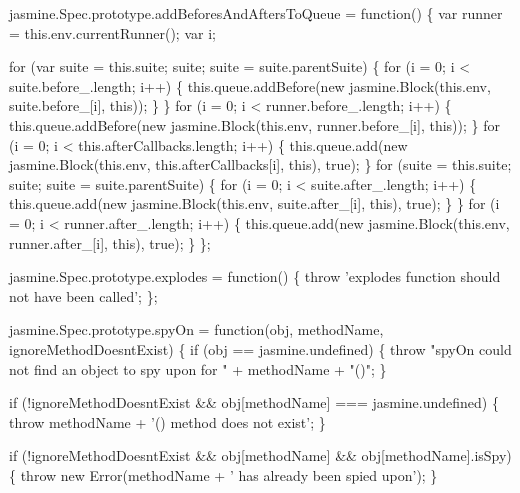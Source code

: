 \begin{DoxyCodeInclude}
jasmine.Spec.prototype.addBeforesAndAftersToQueue = \textcolor{keyword}{function}() \{
  var runner = this.env.currentRunner();
  var i;

  \textcolor{keywordflow}{for} (var suite = this.suite; suite; suite = suite.parentSuite) \{
    \textcolor{keywordflow}{for} (i = 0; i < suite.before\_.length; i++) \{
      this.queue.addBefore(\textcolor{keyword}{new} jasmine.Block(\textcolor{keyword}{this}.env, suite.before\_[i], \textcolor{keyword}{this}));
    \}
  \}
  \textcolor{keywordflow}{for} (i = 0; i < runner.before\_.length; i++) \{
    this.queue.addBefore(\textcolor{keyword}{new} jasmine.Block(\textcolor{keyword}{this}.env, runner.before\_[i], \textcolor{keyword}{this}));
  \}
  \textcolor{keywordflow}{for} (i = 0; i < this.afterCallbacks.length; i++) \{
    this.queue.add(\textcolor{keyword}{new} jasmine.Block(\textcolor{keyword}{this}.env, \textcolor{keyword}{this}.afterCallbacks[i], \textcolor{keyword}{this}), \textcolor{keyword}{true});
  \}
  \textcolor{keywordflow}{for} (suite = this.suite; suite; suite = suite.parentSuite) \{
    \textcolor{keywordflow}{for} (i = 0; i < suite.after\_.length; i++) \{
      this.queue.add(\textcolor{keyword}{new} jasmine.Block(\textcolor{keyword}{this}.env, suite.after\_[i], \textcolor{keyword}{this}), \textcolor{keyword}{true});
    \}
  \}
  \textcolor{keywordflow}{for} (i = 0; i < runner.after\_.length; i++) \{
    this.queue.add(\textcolor{keyword}{new} jasmine.Block(\textcolor{keyword}{this}.env, runner.after\_[i], \textcolor{keyword}{this}), \textcolor{keyword}{true});
  \}
\};

jasmine.Spec.prototype.explodes = \textcolor{keyword}{function}() \{
  \textcolor{keywordflow}{throw} \textcolor{stringliteral}{'explodes function should not have been called'};
\};

jasmine.Spec.prototype.spyOn = \textcolor{keyword}{function}(obj, methodName, ignoreMethodDoesntExist) \{
  \textcolor{keywordflow}{if} (obj == jasmine.undefined) \{
    \textcolor{keywordflow}{throw} \textcolor{stringliteral}{"spyOn could not find an object to spy upon for "} + methodName + \textcolor{stringliteral}{"()"};
  \}

  \textcolor{keywordflow}{if} (!ignoreMethodDoesntExist && obj[methodName] === jasmine.undefined) \{
    \textcolor{keywordflow}{throw} methodName + \textcolor{stringliteral}{'() method does not exist'};
  \}

  \textcolor{keywordflow}{if} (!ignoreMethodDoesntExist && obj[methodName] && obj[methodName].isSpy) \{
    \textcolor{keywordflow}{throw} \textcolor{keyword}{new} Error(methodName + \textcolor{stringliteral}{' has already been spied upon'});
  \}


\end{DoxyCodeInclude}
